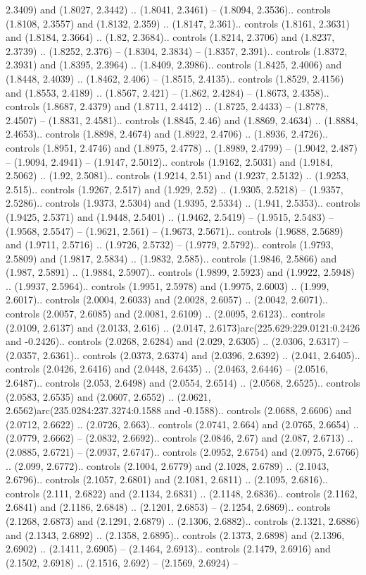 2.3409) and (1.8027, 2.3442) .. (1.8041, 2.3461) -- (1.8094, 2.3536).. controls (1.8108, 2.3557) and (1.8132, 2.359) .. (1.8147, 2.361).. controls (1.8161, 2.3631) and (1.8184, 2.3664) .. (1.82, 2.3684).. controls (1.8214, 2.3706) and (1.8237, 2.3739) .. (1.8252, 2.376) -- (1.8304, 2.3834) -- (1.8357, 2.391).. controls (1.8372, 2.3931) and (1.8395, 2.3964) .. (1.8409, 2.3986).. controls (1.8425, 2.4006) and (1.8448, 2.4039) .. (1.8462, 2.406) -- (1.8515, 2.4135).. controls (1.8529, 2.4156) and (1.8553, 2.4189) .. (1.8567, 2.421) -- (1.862, 2.4284) -- (1.8673, 2.4358).. controls (1.8687, 2.4379) and (1.8711, 2.4412) .. (1.8725, 2.4433) -- (1.8778, 2.4507) -- (1.8831, 2.4581).. controls (1.8845, 2.46) and (1.8869, 2.4634) .. (1.8884, 2.4653).. controls (1.8898, 2.4674) and (1.8922, 2.4706) .. (1.8936, 2.4726).. controls (1.8951, 2.4746) and (1.8975, 2.4778) .. (1.8989, 2.4799) -- (1.9042, 2.487) -- (1.9094, 2.4941) -- (1.9147, 2.5012).. controls (1.9162, 2.5031) and (1.9184, 2.5062) .. (1.92, 2.5081).. controls (1.9214, 2.51) and (1.9237, 2.5132) .. (1.9253, 2.515).. controls (1.9267, 2.517) and (1.929, 2.52) .. (1.9305, 2.5218) -- (1.9357, 2.5286).. controls (1.9373, 2.5304) and (1.9395, 2.5334) .. (1.941, 2.5353).. controls (1.9425, 2.5371) and (1.9448, 2.5401) .. (1.9462, 2.5419) -- (1.9515, 2.5483) -- (1.9568, 2.5547) -- (1.9621, 2.561) -- (1.9673, 2.5671).. controls (1.9688, 2.5689) and (1.9711, 2.5716) .. (1.9726, 2.5732) -- (1.9779, 2.5792).. controls (1.9793, 2.5809) and (1.9817, 2.5834) .. (1.9832, 2.585).. controls (1.9846, 2.5866) and (1.987, 2.5891) .. (1.9884, 2.5907).. controls (1.9899, 2.5923) and (1.9922, 2.5948) .. (1.9937, 2.5964).. controls (1.9951, 2.5978) and (1.9975, 2.6003) .. (1.999, 2.6017).. controls (2.0004, 2.6033) and (2.0028, 2.6057) .. (2.0042, 2.6071).. controls (2.0057, 2.6085) and (2.0081, 2.6109) .. (2.0095, 2.6123).. controls (2.0109, 2.6137) and (2.0133, 2.616) .. (2.0147, 2.6173)arc(225.629:229.0121:0.2426 and -0.2426).. controls (2.0268, 2.6284) and (2.029, 2.6305) .. (2.0306, 2.6317) -- (2.0357, 2.6361).. controls (2.0373, 2.6374) and (2.0396, 2.6392) .. (2.041, 2.6405).. controls (2.0426, 2.6416) and (2.0448, 2.6435) .. (2.0463, 2.6446) -- (2.0516, 2.6487).. controls (2.053, 2.6498) and (2.0554, 2.6514) .. (2.0568, 2.6525).. controls (2.0583, 2.6535) and (2.0607, 2.6552) .. (2.0621, 2.6562)arc(235.0284:237.3274:0.1588 and -0.1588).. controls (2.0688, 2.6606) and (2.0712, 2.6622) .. (2.0726, 2.663).. controls (2.0741, 2.664) and (2.0765, 2.6654) .. (2.0779, 2.6662) -- (2.0832, 2.6692).. controls (2.0846, 2.67) and (2.087, 2.6713) .. (2.0885, 2.6721) -- (2.0937, 2.6747).. controls (2.0952, 2.6754) and (2.0975, 2.6766) .. (2.099, 2.6772).. controls (2.1004, 2.6779) and (2.1028, 2.6789) .. (2.1043, 2.6796).. controls (2.1057, 2.6801) and (2.1081, 2.6811) .. (2.1095, 2.6816).. controls (2.111, 2.6822) and (2.1134, 2.6831) .. (2.1148, 2.6836).. controls (2.1162, 2.6841) and (2.1186, 2.6848) .. (2.1201, 2.6853) -- (2.1254, 2.6869).. controls (2.1268, 2.6873) and (2.1291, 2.6879) .. (2.1306, 2.6882).. controls (2.1321, 2.6886) and (2.1343, 2.6892) .. (2.1358, 2.6895).. controls (2.1373, 2.6898) and (2.1396, 2.6902) .. (2.1411, 2.6905) -- (2.1464, 2.6913).. controls (2.1479, 2.6916) and (2.1502, 2.6918) .. (2.1516, 2.692) -- (2.1569, 2.6924) -- 